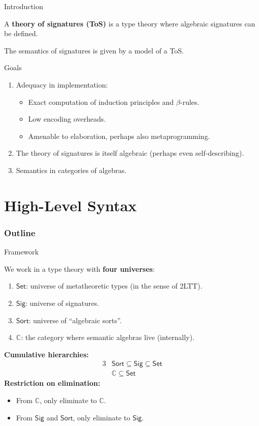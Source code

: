 \documentclass[dvipsnames]{beamer}
\newcommand{\mbb}[1]{\mathbb{#1}}
\newcommand{\Set}{\mathsf{Set}}
\newcommand{\Sort}{\mathsf{Sort}}
\newcommand{\Sig}{\mathsf{Sig}}
\newcommand{\mbbC}{\mbb{C}}
\begin{document}
\begin{frame}{Introduction}

A \textbf{theory of signatures (ToS)} is a type theory where algebraic signatures
can be defined.
\vspace{1em}

The semantics of signatures is given by a model of a ToS.
\vspace{1em}

\begin{block}{Goals}
\begin{enumerate}
  \item Adequacy in implementation:
    \begin{itemize}
      \item Exact computation of induction principles and $\beta$-rules.
      \item Low encoding overheads.
      \item Amenable to elaboration, perhaps also metaprogramming.
    \end{itemize}
  \item The theory of signatures is itself algebraic (perhaps even self-describing).
  \item Semantics in categories of algebras.
\end{enumerate}
\end{block}

\end{frame}

\section{High-Level Syntax}
\begin{frame}
  \frametitle{Outline}
  \tableofcontents[currentsection]
\end{frame}

\begin{frame}{Framework}

We work in a type theory with \textbf{four universes}:
\begin{enumerate}
 \item $\Set$: universe of metatheoretic types (in the sense of 2LTT).
 \item $\Sig$: universe of signatures.
 \item $\Sort$: universe of ``algebraic sorts''.
 \item $\mbbC$: the category where semantic algebras live (internally).
\end{enumerate}
\vspace{1em}
\textbf{Cumulative hierarchies:}
\begin{alignat*}{3}
  & \Sort \subseteq \Sig \subseteq \Set \\
  & \mbbC \subseteq \Set
\end{alignat*}
\textbf{Restriction on elimination:}
\begin{itemize}
  \item From $\mbbC$, only eliminate to $\mbbC$.
  \item From $\Sig$ and $\Sort$, only eliminate to $\Sig$.
\end{itemize}

\end{frame}
\end{document}
